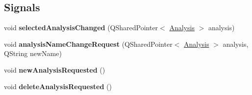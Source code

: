 \subsection*{Signals}
\begin{DoxyCompactItemize}
\item 
\hypertarget{class_picto_1_1_analysis_option_widget_ad3918db3bdbfc1bba1ceff962f5ed18c}{void {\bfseries selected\-Analysis\-Changed} (Q\-Shared\-Pointer$<$ \hyperlink{class_picto_1_1_analysis}{Analysis} $>$ analysis)}\label{class_picto_1_1_analysis_option_widget_ad3918db3bdbfc1bba1ceff962f5ed18c}

\item 
\hypertarget{class_picto_1_1_analysis_option_widget_a535a107dfd012fae2585926262aa6212}{void {\bfseries analysis\-Name\-Change\-Request} (Q\-Shared\-Pointer$<$ \hyperlink{class_picto_1_1_analysis}{Analysis} $>$ analysis, Q\-String new\-Name)}\label{class_picto_1_1_analysis_option_widget_a535a107dfd012fae2585926262aa6212}

\item 
\hypertarget{class_picto_1_1_analysis_option_widget_a86786610af5a633109040a8532639e92}{void {\bfseries new\-Analysis\-Requested} ()}\label{class_picto_1_1_analysis_option_widget_a86786610af5a633109040a8532639e92}

\item 
\hypertarget{class_picto_1_1_analysis_option_widget_a6cc7387fc66bb03f2894ef3b5f0abb5f}{void {\bfseries delete\-Analysis\-Requested} ()}\label{class_picto_1_1_analysis_option_widget_a6cc7387fc66bb03f2894ef3b5f0abb5f}

\end{DoxyCompactItemize}
